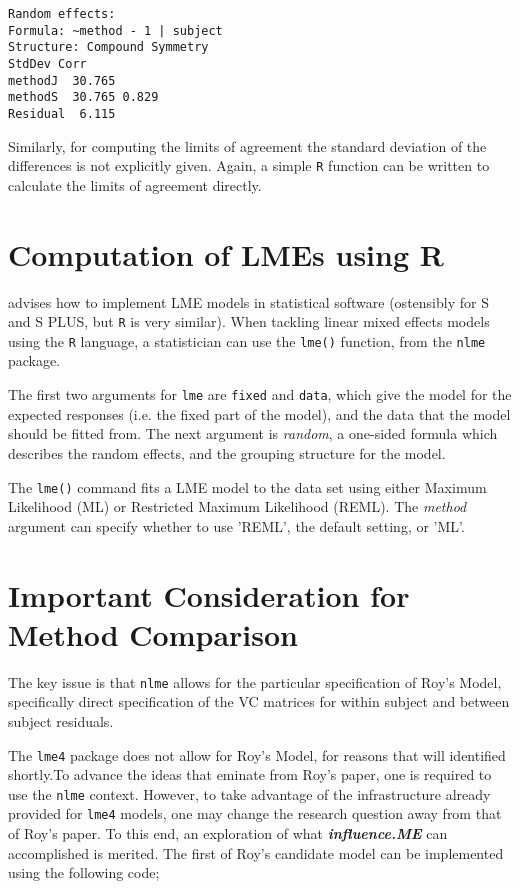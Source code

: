 \documentclass[12pt, a4paper]{report}
\theoremstyle{plain}
\theoremstyle{definition}
\theoremstyle{remark}
\begin{document}
\begin{framed}
\begin{verbatim}
Random effects:
Formula: ~method - 1 | subject
Structure: Compound Symmetry
StdDev Corr
methodJ  30.765
methodS  30.765 0.829
Residual  6.115
\end{verbatim}
\end{framed}

Similarly, for computing the limits of agreement the standard deviation of the differences is not explicitly given. Again, a simple \texttt{R} function can be written to calculate the limits of agreement directly.

\newpage

\section{Computation of LMEs using R} 

\cite{PB} advises how to
implement LME models in statistical software (ostensibly for S and S PLUS, but \texttt{R} is very similar). When tackling linear mixed effects models using the \texttt{R} language, a statistician can use the \texttt{lme()} function, from the \texttt{nlme} package. 

The first two arguments for \texttt{lme} are \texttt{fixed} and \texttt{data}, which give the model for the expected responses (i.e. the fixed part of the model), and the data that the model should be fitted from. The next argument is \emph{random}, a one-sided
formula which describes the random effects, and the grouping structure for the model. 

The \texttt{lme()} command fits a LME model to the data set using either Maximum Likelihood (ML) or Restricted Maximum Likelihood (REML).  The \emph{method} argument can specify whether to use 'REML', the default setting, or 'ML'.


\section{Important Consideration for Method Comparison}

The key issue is that \texttt{nlme} allows for the particular specification of Roy's Model, specifically direct specification of the VC matrices for within subject and between subject residuals.

The \texttt{lme4} package does not allow for Roy's Model, for reasons that will identified shortly.To advance the ideas that eminate from Roy's paper, one is required to use the \texttt{nlme} context. However, to take advantage of the infrastructure already provided for \texttt{lme4} models, one may change the research question away from that of Roy's paper. To this end, an exploration of what \textbf{\textit{influence.ME}} can accomplished is merited. The first of Roy's candidate model can be implemented using the following code;\\
\end{document}
